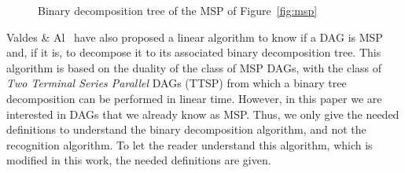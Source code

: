 \begin{figure}[h!]
\begin{center}
  \caption{Binary decomposition tree of the MSP of Figure~\ref{fig:msp}}
  \label{fig:t}
\end{center}
\end{figure}

Valdes \& Al~\cite{Valdes:1979:RSP:800135.804393} have also proposed a linear algorithm to know if a DAG is MSP and, if it is, to decompose it to its associated binary decomposition tree. This algorithm is based on the duality of the class of MSP DAGs, with the class of \emph{Two Terminal Series Parallel} DAGs (TTSP) from which a binary tree decomposition can be performed in linear time. However, in this paper we are interested in DAGs that we already know as MSP. Thus, we only give the needed definitions to understand the binary decomposition algorithm, and not the recognition algorithm. To let the reader understand this algorithm, which is modified in this work, the needed definitions are given. 

